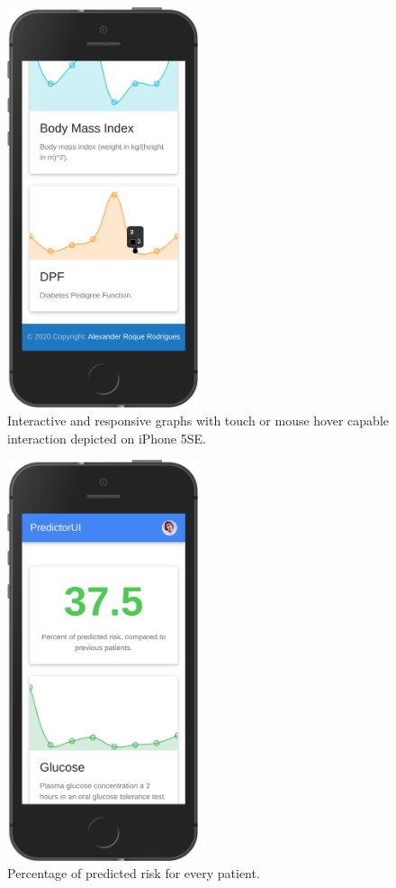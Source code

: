 \documentclass[12pt]{article}
\begin{document}
\begin{figure}[ht]
\centering
\includegraphics[width=0.5\textwidth]{3se.png}
\caption{\label{fig:52} Interactive and responsive graphs with touch or mouse hover capable interaction depicted on iPhone 5SE.}
\end{figure}
\begin{figure}[ht]
\centering
\includegraphics[width=0.5\textwidth]{4se.png}
\caption{\label{fig:53} Percentage of predicted risk for every patient.}
\end{figure}
\end{document}
